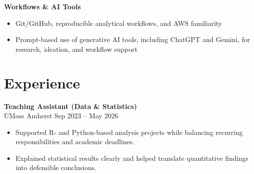 \documentclass[10pt, letterpaper]{article}
\begin{document}
\textbf{Workflows \& AI Tools}
\begin{itemize}
    \item Git/GitHub, reproducible analytical workflows, and AWS familiarity
    \item Prompt-based use of generative AI tools, including ChatGPT and Gemini, for research, ideation, and workflow support
\end{itemize}
   




    \section*{Experience}
    \textbf{Teaching Assistant (Data \& Statistics)} \\
UMass Amherst \hfill Sep 2023 -- May 2026
\begin{itemize}
    \item Supported R- and Python-based analysis projects while balancing recurring responsibilities and academic deadlines.
    \item Explained statistical results clearly and helped translate quantitative findings into defensible conclusions.
\end{itemize}
\end{document}
